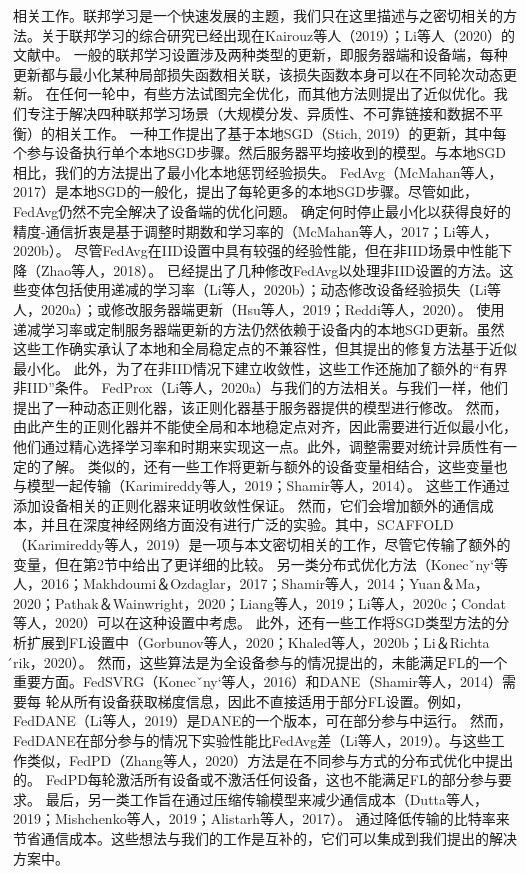 相关工作。联邦学习是一个快速发展的主题，我们只在这里描述与之密切相关的方法。关于联邦学习的综合研究已经出现在Kairouz等人（2019）；Li等人（2020）的文献中。
一般的联邦学习设置涉及两种类型的更新，即服务器端和设备端，每种更新都与最小化某种局部损失函数相关联，该损失函数本身可以在不同轮次动态更新。
在任何一轮中，有些方法试图完全优化，而其他方法则提出了近似优化。我们专注于解决四种联邦学习场景（大规模分发、异质性、不可靠链接和数据不平衡）的相关工作。
一种工作提出了基于本地SGD（Stich, 2019）的更新，其中每个参与设备执行单个本地SGD步骤。然后服务器平均接收到的模型。与本地SGD相比，我们的方法提出了最小化本地惩罚经验损失。
FedAvg（McMahan等人，2017）是本地SGD的一般化，提出了每轮更多的本地SGD步骤。尽管如此，FedAvg仍然不完全解决了设备端的优化问题。
确定何时停止最小化以获得良好的精度-通信折衷是基于调整时期数和学习率的（McMahan等人，2017；Li等人，2020b）。
尽管FedAvg在IID设置中具有较强的经验性能，但在非IID场景中性能下降（Zhao等人，2018）。
已经提出了几种修改FedAvg以处理非IID设置的方法。这些变体包括使用递减的学习率（Li等人，2020b）；动态修改设备经验损失（Li等人，2020a）；或修改服务器端更新（Hsu等人，2019；Reddi等人，2020）。
使用递减学习率或定制服务器端更新的方法仍然依赖于设备内的本地SGD更新。虽然这些工作确实承认了本地和全局稳定点的不兼容性，但其提出的修复方法基于近似最小化。
此外，为了在非IID情况下建立收敛性，这些工作还施加了额外的“有界非IID”条件。
FedProx（Li等人，2020a）与我们的方法相关。与我们一样，他们提出了一种动态正则化器，该正则化器基于服务器提供的模型进行修改。
然而，由此产生的正则化器并不能使全局和本地稳定点对齐，因此需要进行近似最小化，他们通过精心选择学习率和时期来实现这一点。此外，调整需要对统计异质性有一定的了解。
类似的，还有一些工作将更新与额外的设备变量相结合，这些变量也与模型一起传输（Karimireddy等人，2019；Shamir等人，2014）。
这些工作通过添加设备相关的正则化器来证明收敛性保证。
然而，它们会增加额外的通信成本，并且在深度神经网络方面没有进行广泛的实验。其中，SCAFFOLD（Karimireddy等人，2019）是一项与本文密切相关的工作，尽管它传输了额外的变量，但在第2节中给出了更详细的比较。
另一类分布式优化方法（Konecˇny`等人，2016；Makhdoumi＆Ozdaglar，2017；Shamir等人，2014；Yuan＆Ma，2020；Pathak＆Wainwright，2020；Liang等人，2019；Li等人，2020c；Condat等人，2020）可以在这种设置中考虑。
此外，还有一些工作将SGD类型方法的分析扩展到FL设置中（Gorbunov等人，2020；Khaled等人，2020b；Li＆Richta ́rik，2020）。
然而，这些算法是为全设备参与的情况提出的，未能满足FL的一个重要方面。FedSVRG（Konecˇny`等人，2016）和DANE（Shamir等人，2014）需要每
轮从所有设备获取梯度信息，因此不直接适用于部分FL设置。例如，FedDANE（Li等人，2019）是DANE的一个版本，可在部分参与中运行。
然而，FedDANE在部分参与的情况下实验性能比FedAvg差（Li等人，2019）。与这些工作类似，FedPD（Zhang等人，2020）方法是在不同参与方式的分布式优化中提出的。
FedPD每轮激活所有设备或不激活任何设备，这也不能满足FL的部分参与要求。
最后，另一类工作旨在通过压缩传输模型来减少通信成本（Dutta等人，2019；Mishchenko等人，2019；Alistarh等人，2017）。
通过降低传输的比特率来节省通信成本。这些想法与我们的工作是互补的，它们可以集成到我们提出的解决方案中。

